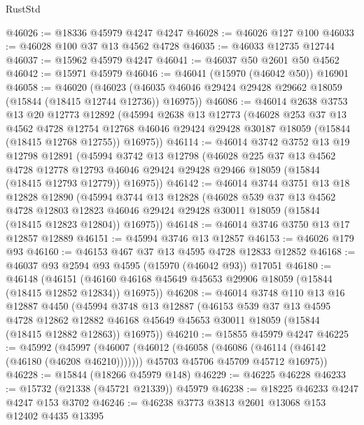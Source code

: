 \begin{lexlean}{RustStd}
\begin{coremodule}
@46026 := @18336 @45979 @4247 @4247
@46028 := @46026 @127 @100
@46033 := @46028 @100 @37 @13 @4562 @4728
@46035 := @46033 @12735 @12744
@46037 := @15962 @45979 @4247
@46041 := @46037 @50 @2601 @50 @4562
@46042 := @15971 @45979
@46046 := @46041 (@15970 (@46042 @50)) @16901
@46058 := @46020
    (@46023 (@46035 @46046 @29424 @29428 @29662 @18059 (@15844 (@18415 @12744 @12736)) @16975))
@46086 := @46014
    @2638
    @3753
    @13
    @20
    @12773
    @12892
    (@45994
      @2638
      @13
      @12773
      (@46028
        @253
        @37
        @13
        @4562
        @4728
        @12754
        @12768
        @46046
        @29424
        @29428
        @30187
        @18059
        (@15844 (@18415 @12768 @12755))
        @16975))
@46114 := @46014
    @3742
    @3752
    @13
    @19
    @12798
    @12891
    (@45994
      @3742
      @13
      @12798
      (@46028
        @225
        @37
        @13
        @4562
        @4728
        @12778
        @12793
        @46046
        @29424
        @29428
        @29466
        @18059
        (@15844 (@18415 @12793 @12779))
        @16975))
@46142 := @46014
    @3744
    @3751
    @13
    @18
    @12828
    @12890
    (@45994
      @3744
      @13
      @12828
      (@46028
        @539
        @37
        @13
        @4562
        @4728
        @12803
        @12823
        @46046
        @29424
        @29428
        @30011
        @18059
        (@15844 (@18415 @12823 @12804))
        @16975))
@46148 := @46014 @3746 @3750 @13 @17 @12857 @12889
@46151 := @45994 @3746 @13 @12857
@46153 := @46026 @179 @93
@46160 := @46153 @467 @37 @13 @4595 @4728 @12833 @12852
@46168 := @46037 @93 @2594 @93 @4595 (@15970 (@46042 @93)) @17051
@46180 := @46148
    (@46151 (@46160 @46168 @45649 @45653 @29906 @18059 (@15844 (@18415 @12852 @12834)) @16975))
@46208 := @46014
    @3748
    @110
    @13
    @16
    @12887
    @4450
    (@45994
      @3748
      @13
      @12887
      (@46153
        @539
        @37
        @13
        @4595
        @4728
        @12862
        @12882
        @46168
        @45649
        @45653
        @30011
        @18059
        (@15844 (@18415 @12882 @12863))
        @16975))
@46210 := @15855 @45979 @4247
@46225 := @45992
    (@45997
      (@46007
        (@46012 (@46058 (@46086 (@46114 (@46142 (@46180 (@46208 @46210)))))))
        @45703
        @45706
        @45709
        @45712
        @16975))
@46228 := @15844 (@18266 @45979 @148)
@46229 := @46225 @46228
@46233 := @15732 (@21338 (@45721 @21339)) @45979
@46238 := @18225 @46233 @4247 @4247 @153 @3702
@46246 := @46238 @3773 @3813 @2601 @13068 @153 @12402 @4435 @13395

\end{coremodule}
\end{lexlean}
